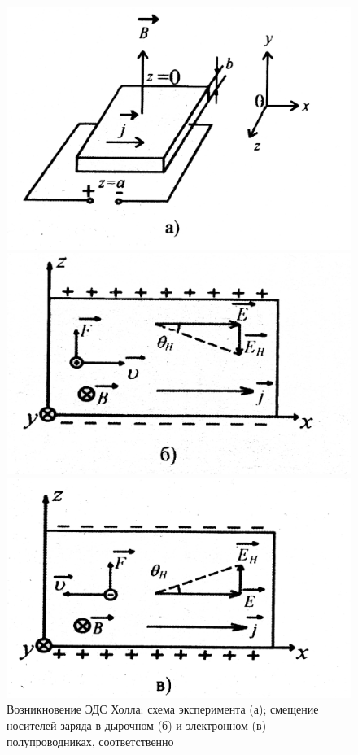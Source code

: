 \begin{figure}[h!]
\begin{minipage}[h]{0.329\linewidth}
		\centering
	\includegraphics[width=\linewidth]{fig/21a}
\end{minipage}
\begin{minipage}[h]{0.329\linewidth}
		\centering
	\includegraphics[width=\linewidth]{fig/21b}
\end{minipage}
\begin{minipage}[h]{0.329\linewidth}
		\centering
	\includegraphics[width=\linewidth]{fig/21c}
\end{minipage}
	\caption{Возникновение ЭДС Холла: схема эксперимента (а); смещение носителей заряда в дырочном (б) и электронном (в) полупроводниках, соответственно}
	\label{fig:8}
\end{figure}

